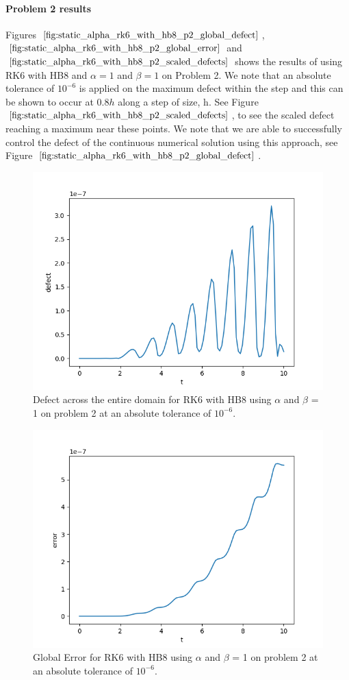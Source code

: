 \paragraph{Problem 2 results}
Figures $\ref{fig:static_alpha_rk6_with_hb8_p2_global_defect}$, $\ref{fig:static_alpha_rk6_with_hb8_p2_global_error}$ and $\ref{fig:static_alpha_rk6_with_hb8_p2_scaled_defects}$ shows the results of using RK6 with HB8 and $\alpha = 1$ and $\beta = 1$ on Problem 2. We note that an absolute tolerance of $10^{-6}$ is applied on the maximum defect within the step and this can be shown to occur at $0.8h$ along a step of size, h. See Figure $\ref{fig:static_alpha_rk6_with_hb8_p2_scaled_defects}$, to see the scaled defect reaching a maximum near these points. We note that we are able to successfully control the defect of the continuous numerical solution using this approach, see Figure $\ref{fig:static_alpha_rk6_with_hb8_p2_global_defect}$. 
\begin{figure}[H]
\centering
\includegraphics[width=0.7\linewidth]{./figures/static_alpha_rk6_with_hb8_p2_global_defect}
\caption{Defect across the entire domain for RK6 with HB8 using $\alpha$ and $\beta$ = 1 on problem 2 at an absolute tolerance of $10^{-6}$.}
\label{fig:static_alpha_rk6_with_hb8_p2_global_defect}
\end{figure}

\begin{figure}[H]
\centering
\includegraphics[width=0.7\linewidth]{./figures/static_alpha_rk6_with_hb8_p2_global_error}
\caption{Global Error for RK6 with HB8 using $\alpha$ and $\beta$ = 1 on problem 2 at an absolute tolerance of $10^{-6}$.}
\label{fig:static_alpha_rk6_with_hb8_p2_global_error}
\end{figure}

